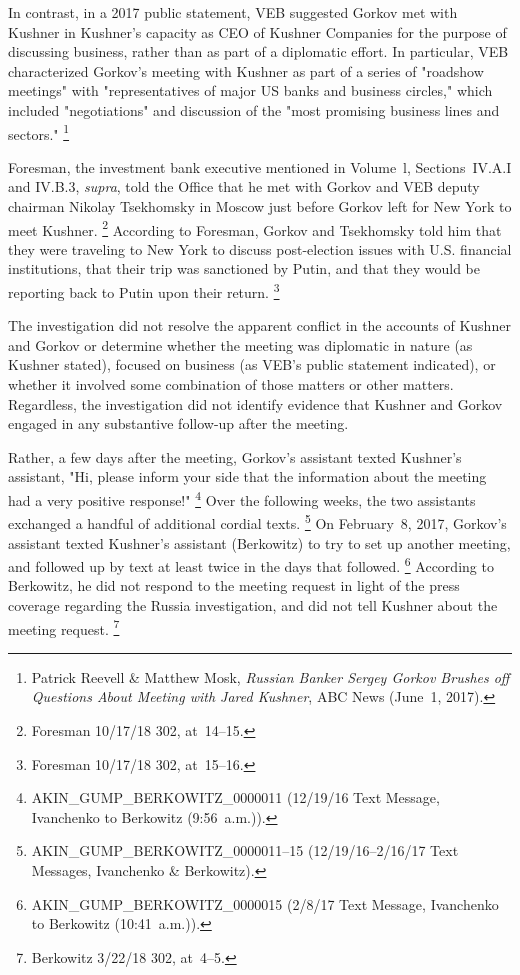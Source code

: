 In contrast, in a 2017 public statement, VEB suggested Gorkov met with Kushner in Kushner's capacity as CEO of Kushner Companies for the purpose of discussing business, rather than as part of a diplomatic effort.
In particular, VEB characterized Gorkov's meeting with Kushner as part of a series of "roadshow meetings" with "representatives of major US banks and business circles," which included "negotiations" and discussion of the "most promising business lines and sectors."%
\footnote{Patrick Reevell \& Matthew Mosk, \textit{Russian Banker Sergey Gorkov Brushes off Questions About Meeting with Jared Kushner}, ABC News (June~1, 2017).}

Foresman, the investment bank executive mentioned in Volume~l, Sections~IV.A.I and IV.B.3, \textit{supra}, told the Office that he met with Gorkov and VEB deputy chairman Nikolay Tsekhomsky in Moscow just before Gorkov left for New York to meet Kushner.%
\footnote{Foresman 10/17/18 302, at~14--15.}
According to Foresman, Gorkov and Tsekhomsky told him that they were traveling to New York to discuss post-election issues with U.S. financial institutions, that their trip was sanctioned by Putin, and that they would be reporting back to Putin upon their return.%
\footnote{Foresman 10/17/18 302, at~15--16.}

The investigation did not resolve the apparent conflict in the accounts of Kushner and Gorkov or determine whether the meeting was diplomatic in nature (as Kushner stated), focused on business (as VEB's public statement indicated), or whether it involved some combination of those matters or other matters.
Regardless, the investigation did not identify evidence that Kushner and Gorkov engaged in any substantive follow-up after the meeting.

Rather, a few days after the meeting, Gorkov's assistant texted Kushner's assistant, "Hi, please inform your side that the information about the meeting had a very positive response!"%
\footnote{AKIN\_GUMP\_BERKOWITZ\_0000011 (12/19/16 Text Message, Ivanchenko to Berkowitz (9:56~a.m.)).}
Over the following weeks, the two assistants exchanged a handful of additional cordial texts.%
\footnote{AKIN\_GUMP\_BERKOWITZ\_0000011--15 (12/19/16--2/16/17 Text Messages, Ivanchenko \& Berkowitz).}
On February~8, 2017, Gorkov's assistant texted Kushner's assistant (Berkowitz) to try to set up another meeting, and followed up by text at least twice in the days that followed.%
\footnote{AKIN\_GUMP\_BERKOWITZ\_0000015 (2/8/17 Text Message, Ivanchenko to Berkowitz (10:41~a.m.)).}
According to Berkowitz, he did not respond to the meeting request in light of the press coverage regarding the Russia investigation, and did not tell Kushner about the meeting request.%
\footnote{Berkowitz 3/22/18 302, at~4--5.}

